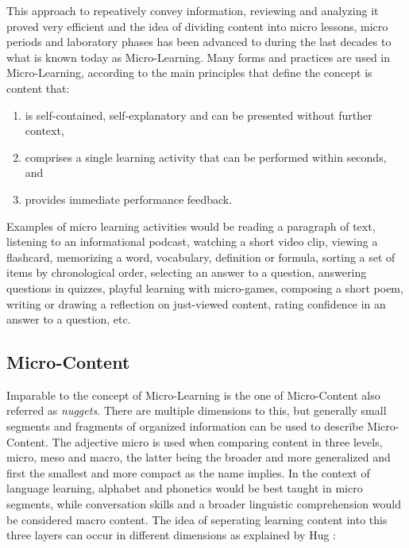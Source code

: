 This approach to repeatively convey information, reviewing and analyzing it proved
very efficient and the idea of dividing content into micro lessons, micro periods and
laboratory phases has been advanced to during the last decades to what is known today
as Micro-Learning. 
Many forms and practices are used in Micro-Learning, according to 
\cite{webservicearchitectureforsocialmicrolearning} the main 
principles that define the concept is content that:

\begin{enumerate}
    \item is self-contained, self-explanatory and can be presented without further context,
    \item comprises a single learning activity that can be performed within seconds, and
    \item provides immediate performance feedback.
\end{enumerate}


Examples of micro learning activities would be reading a paragraph of text, 
listening to an informational podcast, watching a short video clip, viewing a 
flashcard, memorizing a word, vocabulary, definition or formula, sorting a set
of items by chronological order, selecting an answer to a question, answering 
questions in quizzes, playful learning with micro-games, composing a short poem,
writing or drawing a reflection on just-viewed content, rating confidence in an 
answer to a question, etc.


\subsection{Micro-Content}

Imparable to the concept of Micro-Learning is the one of Micro-Content also referred as
\textit{nuggets}. There are 
multiple dimensions to this, but generally small segments and fragments of organized
information can be used to describe Micro-Content.
The adjective micro is used when comparing content in three levels, micro, meso and
macro, the latter being the broader and more generalized and first the smallest and 
more compact as the name implies. In the context of language learning, alphabet and
phonetics would be best taught in micro segments, while conversation skills and 
a broader linguistic comprehension would be considered macro content.
The idea of seperating learning content into this three layers can occur in different
dimensions as explained by Hug \cite{microlearningdimensions}:

